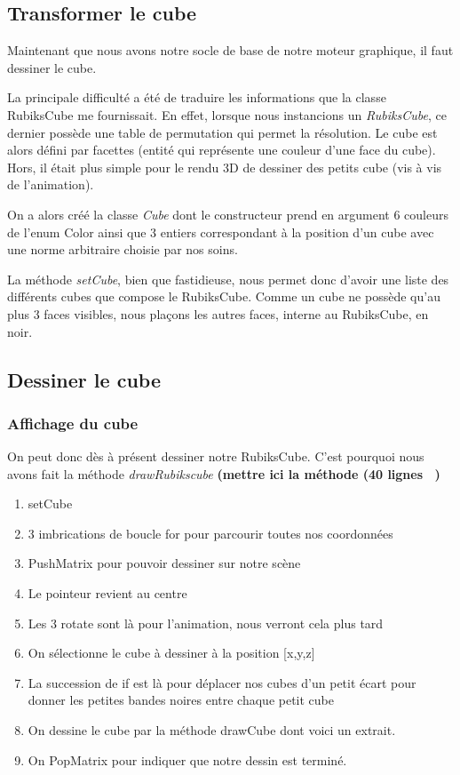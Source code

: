 \subsection{Transformer le cube}
Maintenant que nous avons notre socle de base de notre moteur graphique, il faut dessiner le cube.

La principale difficulté a été de traduire les informations que la classe RubiksCube me fournissait. En effet, lorsque nous instancions un \textit{RubiksCube}, ce dernier possède une table de permutation qui permet la résolution. Le cube est alors défini par facettes (entité qui représente une couleur d’une face du cube). Hors, il était plus simple pour le rendu 3D de dessiner des petits cube (vis à vis de l’animation).

On a alors créé la classe \textit{Cube} dont le constructeur prend en argument 6 couleurs de l’enum Color ainsi que 3 entiers correspondant à la position d’un cube avec une norme arbitraire choisie par nos soins.

La méthode \textit{setCube}, bien que fastidieuse, nous permet donc d’avoir une liste des différents cubes que compose le RubiksCube. Comme un cube ne possède qu’au plus 3 faces visibles, nous plaçons les autres faces, interne au RubiksCube, en noir.

\subsection{Dessiner le cube}
\subsubsection{Affichage du cube}
On peut donc dès à présent dessiner notre RubiksCube. C’est pourquoi nous avons fait la méthode \textit{drawRubikscube} 
\textbf{(mettre ici la méthode (40 lignes ~)}

\begin{enumerate}
    \item setCube
    \item 3 imbrications de boucle for pour parcourir toutes nos coordonnées
    \item PushMatrix pour pouvoir dessiner sur notre scène
    \item Le pointeur revient au centre
    \item Les 3 rotate sont là pour l’animation, nous verront cela plus tard
    \item On sélectionne le cube à dessiner à la position [x,y,z]
    \item La succession de if est là pour déplacer nos cubes d’un petit écart pour donner les petites bandes noires entre chaque petit cube
    \item On dessine le cube par la méthode drawCube dont voici un extrait.
    \item On PopMatrix pour indiquer que notre dessin est terminé.
\end{enumerate}

